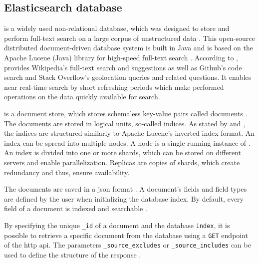 \subsection{Elasticsearch database}\label{sec:db}

\databaseName{} is a widely used non-relational database, which was designed to store and perform full-text search on a large corpus of unstructured data \cite{Elasticsearch2017}.
This open-source distributed document-driven database system is built in Java and is based on the Apache Lucene (Java) library for high-speed full-text search \cite{Elasticsearch2017, Elasticsearch2019}.
According to \citeauthor{Elasticsearch2019}, \databaseName{} provides Wikipedia's full-text search 
and suggestions as well as Github's code search and Stack Overflow's geolocation queries and related questions.
It enables near real-time search by short refreshing periods which make performed operations on the data quickly available for search.

\databaseName{} is a document store, which stores schemaless key-value pairs called documents \cite{flask2018}.
The documents are stored in logical units, so-called indices.
As stated by \citeauthor{Elasticsearch2019} and \citeauthor{Elasticsearch2017}, the indices are structured similarly to Apache Lucene's inverted index format.
An index can be spread into multiple nodes.
A node is a single running instance of \databaseName{} \cite{Elasticsearch2019}.
An index is divided into one or more shards, which can be stored on different servers and enable parallelization.
Replicas are copies of shards, which create redundancy and thus, ensure availability. %

The documents are saved in a \ac{json} format \cite{Elasticsearch2017}.
A document's fields and field types are defined by the user when initializing the database index.
By default, every field of a document is indexed and searchable \cite{Elasticsearch2019}.

By specifying the unique \texttt{\_id} of a document and the database \texttt{index}, 
it is possible to retrieve a specific document from the database using a \texttt{GET} endpoint of the \ac{http} \ac{api}.
The parameters \texttt{\_source\_excludes} or \texttt{\_source\_includes} can be used to define the structure of the response \cite{Elasticsearch-get}.

